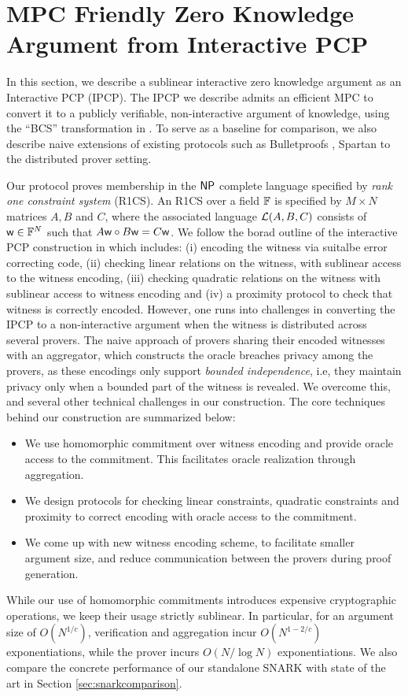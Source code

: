 \section{MPC Friendly Zero Knowledge Argument from Interactive PCP}
In this section, we describe a sublinear interactive zero knowledge argument as
an Interactive PCP (IPCP). The IPCP we describe admits an efficient MPC to
convert it to a publicly verifiable, non-interactive argument of knowledge,
using the ``BCS'' transformation in \cite{iop}. To serve as a
baseline for comparison, we also describe naive extensions of existing protocols
such as Bulletproofs \cite{bulletproofs}, Spartan \cite{spartan} to the
distributed prover setting. 

Our protocol proves membership in the $\mathsf{NP}$ complete
language specified by {\em rank one constraint system} (R1CS). An R1CS over a
field $\mathbb{F}$ is specified by $M\times N$ matrices $A,B$ and $C$, where the
associated language $\mathcal{L}(A,B,C)$ consists of $\mathsf{w}\in \mathbb{F}^N$ such that
$A\mathsf{w}\circ B\mathsf{w}=C\mathsf{w}$. We follow the borad outline of the interactive PCP
construction in \cite{ligero} which includes: (i) encoding the witness via suitalbe
error correcting code, (ii) checking linear relations on the witness, with
sublinear access to the witness encoding, (iii) checking quadratic relations on
the witness with sublinear access to witness encoding and (iv) a proximity
protocol to check that witness is correctly encoded. However, one runs into 
challenges in converting the IPCP to a non-interactive
argument when the witness is distributed across several provers. The naive
approach of provers sharing their encoded witnesses with an aggregator, which
constructs the oracle breaches privacy among the provers, as these encodings
only support {\em bounded independence}, i.e, they maintain privacy only when a
bounded part of the witness is revealed. We overcome this, and several other
technical challenges in our construction. The core techniques behind our
construction are summarized below:
\begin{itemize}
\item We use homomorphic commitment over witness encoding and provide oracle
access to the commitment. This facilitates oracle realization through
aggregation.
\item We design protocols for checking linear constraints, quadratic constraints
and proximity to correct encoding with oracle access to the commitment.
\item We come up with new witness encoding scheme, to facilitate smaller
argument size, and reduce communication between the provers during proof
generation.
\end{itemize}
While our use of homomorphic commitments introduces expensive cryptographic
operations, we keep their usage strictly sublinear. In particular, for an
argument size of $O(N^{1/c})$, verification and aggregation incur $O(N^{1-2/c})$
exponentiations, while the prover incurs $O(N/\log N)$ exponentiations. We also
compare the concrete performance of our standalone SNARK with state of the art in Section
\ref{sec:snarkcomparison}.
